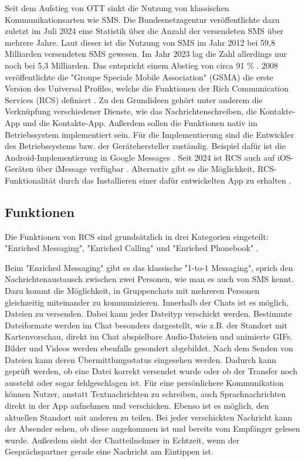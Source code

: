\documentclass[conference]{IEEEtran}
\begin{document}
Seit dem Aufstieg von OTT sinkt die Nutzung von klassischen Kommunikationsarten wie SMS.
Die Bundesnetzagentur veröffentlichte dazu zuletzt im Juli 2024 eine Statistik über die Anzahl der versendeten SMS über mehrere Jahre.
Laut dieser ist die Nutzung von SMS im Jahr 2012 bei 59,8 Milliarden versendeten SMS gewesen.
Im Jahr 2023 lag die Zahl allerdings nur noch bei 5,3 Milliarden.
Das entspricht einem Abstieg von circa 91 \% \cite{smsstats}.
2008 veröffentlichte die "Groupe Speciale Mobile Association" (GSMA) die erste Version des Universal Profiles, welche die Funktionen der Rich Communication Services (RCS) definiert \cite{rcsuite}.
Zu den Grundideen gehört unter anderem die Verknüpfung verschiedener Dienste, wie das Nachrichtenschreiben, die Kontakte-App und die Kontakte-App.
Außerdem sollen die Funktionen nativ im Betriebssystem implementiert sein.
Für die Implementierung sind die Entwickler des Betriebssystems bzw. der Gerätehersteller zuständig.
Beispiel dafür ist die Android-Implementierung in Google Messages \cite{googlemessages}.
Seit 2024 ist RCS auch auf iOS-Geräten über iMessage verfügbar \cite{applemessages}.
Alternativ gibt es die Möglichkeit, RCS-Funktionalität durch das Installieren einer dafür entwickelten App zu erhalten \cite{uniprof}.

\subsection{Funktionen}

Die Funktionen von RCS sind grundsätzlich in drei Kategorien eingeteilt: "Enriched Messaging", "Enriched Calling" und "Enriched Phonebook" \cite{rcsuite,uniprof}.

Beim "Enriched Messaging" gibt es das klassische "1-to-1 Messaging", sprich den Nachrichtenaustausch zwischen zwei Personen, wie man es auch von SMS kennt.
Dazu kommt die Möglichkeit, in Gruppenchats mit mehreren Personen gleichzeitig miteinander zu kommunizieren.
Innerhalb der Chats ist es möglich, Dateien zu versenden.
Dabei kann jeder Dateityp verschickt werden. Bestimmte Dateiformate werden im Chat besonders dargestellt, wie z.B. der Standort mit Kartenvorschau, direkt im Chat abspielbare Audio-Dateien und animierte GIFs.
Bilder und Videos werden ebenfalls gesondert abgebildet.
Nach dem Senden von Dateien kann deren Übermittlungsstatus eingesehen werden.
Dadurch kann geprüft werden, ob eine Datei korrekt versendet wurde oder ob der Transfer noch aussteht oder sogar fehlgeschlagen ist.
Für eine persönlichere Kommunikation können Nutzer, anstatt Textnachrichten zu schreiben, auch Sprachnachrichten direkt in der App aufnehmen und verschicken.
Ebenso ist es möglich, den aktuellen Standort mit anderen zu teilen.
Bei jeder verschickten Nachricht kann der Absender sehen, ob diese angekommen ist und bereits vom Empfänger gelesen wurde.
Außerdem sieht der Chatteilnehmer in Echtzeit, wenn der Gesprächspartner gerade eine Nachricht am Eintippen ist.
\end{document}
